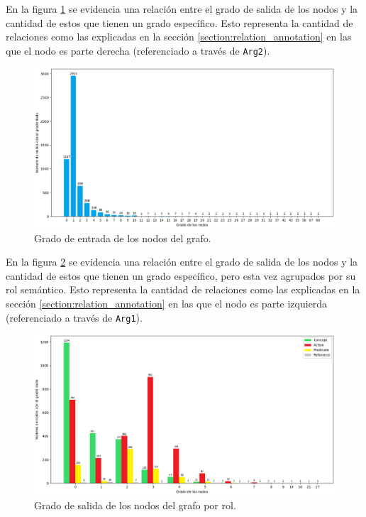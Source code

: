 En la figura \ref{fig:in_degree_all_nodes} se evidencia una relación entre el grado de salida de los nodos y la cantidad de estos que tienen un grado específico. Esto representa la cantidad de relaciones como las explicadas en la sección \ref{section:relation_annotation} en las que el nodo es parte derecha (referenciado a través de \texttt{Arg2}).
\begin{figure}[H]
	\begin{center}
		\includegraphics[width=\textwidth]{graphics/degree2.png}
		\caption[Grado de entrada de los nodos del grafo]{Grado de entrada de los nodos del grafo.}
		\label{fig:in_degree_all_nodes}
	\end{center}
\end{figure}

En la figura \ref{fig:out_degree_nodes_by_rol} se evidencia una relación entre el grado de salida de los nodos y la cantidad de estos que tienen un grado específico, pero esta vez agrupados por su rol semántico. Esto representa la cantidad de relaciones como las explicadas en la sección \ref{section:relation_annotation} en las que el nodo es parte izquierda (referenciado a través de \texttt{Arg1}).
\begin{figure}[H]
	\begin{center}
		\includegraphics[width=\textwidth]{graphics/degree3.png}
		\caption[Grado de salida de los nodos del grafo por rol]{Grado de salida de los nodos del grafo por rol.}
		\label{fig:out_degree_nodes_by_rol}
	\end{center}
\end{figure}

